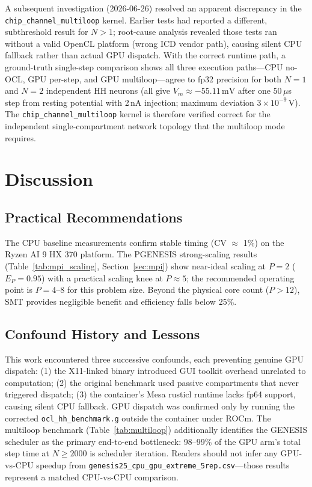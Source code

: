 \documentclass[11pt,a4paper]{article}
\begin{document}
A subsequent investigation (2026-06-26) resolved an apparent discrepancy in the
\texttt{chip\_channel\_multiloop} kernel.  Earlier tests had reported a different,
subthreshold result for $N > 1$; root-cause analysis revealed those tests ran without a
valid OpenCL platform (wrong ICD vendor path), causing silent CPU fallback rather than
actual GPU dispatch.  With the correct runtime path, a ground-truth single-step
comparison shows all three execution paths---CPU no-OCL, GPU per-step, and GPU
multiloop---agree to fp32 precision for both $N = 1$ and $N = 2$ independent HH neurons
(all give $V_m \approx -55.11\,\mathrm{mV}$ after one 50\,$\mu$s step from resting
potential with 2\,nA injection; maximum deviation $3 \times 10^{-9}$\,V).  The
\texttt{chip\_channel\_multiloop} kernel is therefore verified correct for the
independent single-compartment network topology that the multiloop mode requires.

\section{Discussion}

\subsection{Practical Recommendations}

The CPU baseline measurements confirm stable timing (CV $\approx$ 1\%) on the Ryzen AI 9 HX 370 platform. The PGENESIS strong-scaling results (Table~\ref{tab:mpi_scaling}, Section~\ref{sec:mpi}) show near-ideal scaling at $P = 2$ ($E_P = 0.95$) with a practical scaling knee at $P \approx 5$; the recommended operating point is $P = 4$--$8$ for this problem size. Beyond the physical core count ($P > 12$), SMT provides negligible benefit and efficiency falls below 25\%.

\subsection{Confound History and Lessons}

This work encountered three successive confounds, each preventing genuine GPU dispatch:
(1) the X11-linked binary introduced GUI toolkit overhead unrelated to computation;
(2) the original benchmark used passive compartments that never triggered dispatch;
(3) the container's Mesa rusticl runtime lacks fp64 support, causing silent CPU fallback.
GPU dispatch was confirmed only by running the corrected \texttt{ocl\_hh\_benchmark.g} outside the container under ROCm. The multiloop benchmark (Table~\ref{tab:multiloop}) additionally identifies the GENESIS scheduler as the primary end-to-end bottleneck: 98--99\% of the GPU arm's total step time at $N \geq 2000$ is scheduler iteration. Readers should not infer any GPU-vs-CPU speedup from \texttt{genesis25\_cpu\_gpu\_extreme\_5rep.csv}---those results represent a matched CPU-vs-CPU comparison.
\end{document}
